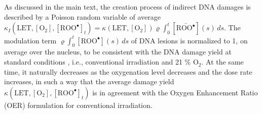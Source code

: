 \documentclass[10pt]{iopart}
\numberwithin{table}{section}
\begin{document}
As discussed in the main text, the creation process of indirect DNA damages is described by a Poisson random variable of average $\kappa_I \left( \mathrm{LET}, [\mathrm{O_2}], [\mathrm{ROO^\bullet}]_t \right) = \kappa\left( \mathrm{LET}, [\mathrm{O_2}] \right)\varrho \int_{0}^t [\bar{\mathrm{ROO^\bullet}}](s) \,ds$. The modulation term $\varrho \int_{0}^t [\mathrm{ROO^\bullet}](s) \,ds$ of DNA lesions is normalized to 1, on average over the nucleus, to be consistent with the DNA damage yield at standard conditions \cite{kundrat2020analytical}, i.e., conventional irradiation and 21 \% $\mathrm{O_2}$. At the same time, it naturally decreases as the oxygenation level decreases and the dose rate increases, in such a way that the average damage yield $\kappa \left( \mathrm{LET}, [\mathrm{O_2}], [\mathrm{ROO^\bullet}]_t \right)$ is in agreement with the Oxygen Enhancement Ratio (OER) formulation \cite{Scifoni2013, Epp1972} for conventional irradiation.
\end{document}
